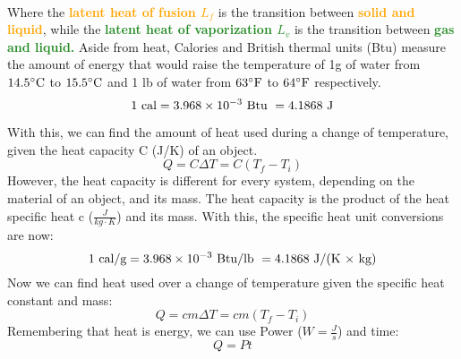 \documentclass[11pt]{article}
\newcommand{\fahrenheit}{\degree \text{F}}
\begin{document}
        \noindent \\ Where the \textcolor{orange}{\textbf{latent heat of fusion $L_f$}} is the transition between \textcolor{orange}{\textbf{solid and liquid}},
    while the \textcolor{ForestGreen}{\textbf{latent heat of vaporization $L_v$}} is the transition between \textcolor{ForestGreen}{\textbf{gas and liquid.}}
    Aside from heat, Calories and British thermal units (Btu) measure the amount of energy that would raise the temperature of 1g of water
    from $14.5\celsius$ to $15.5\celsius$ and 1 lb of water from $63\fahrenheit$ to $64\fahrenheit$ respectively.
    \begin{equation}
        1 \text{ cal} = 3.968 \times 10^{-3} \text{ Btu }= 4.1868 \text{ J} \notag
    \end{equation}

    \noindent With this, we can find the amount of heat used during a change of temperature,
    given the heat capacity C (J/K) of an object.
    \begin{equation}
        Q = C \Delta T = C(T_f - T_i) \tag{heat capacity}
    \end{equation}
    However, the heat capacity is different for every system, depending on the material of an object, and its mass.
    The heat capacity is the product of the heat specific heat c ($\frac{J}{kg \cdot K}$) and its mass.
    With this, the specific heat unit conversions are now:
     \begin{equation}
          1 \text{ cal/g} = 3.968 \times 10^{-3} \text{ Btu/lb }= 4.1868 \text{ J/(K $\times$ kg)} \notag
    \end{equation}
    \noindent Now we can find heat used over a change of temperature given the specific heat constant and mass:
    \begin{equation}
        Q = cm \Delta T = cm(T_f - T_i) \tag{specific heat}
    \end{equation}
    \noindent Remembering that heat is energy, we can use Power ($W = \frac{J}{s}$) and time:
    \begin{equation}
        Q = Pt \tag{power}
    \end{equation}
\end{document}
